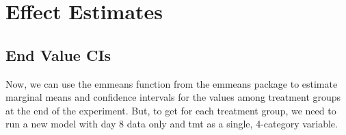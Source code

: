 \documentclass[
]{article}
\begin{document}
\hypertarget{effect-estimates}{%
\section{Effect Estimates}\label{effect-estimates}}

\hypertarget{end-value-cis}{%
\subsection{End Value CIs}\label{end-value-cis}}

Now, we can use the emmeans function from the emmeans package to
estimate marginal means and confidence intervals for the values among
treatment groups at the end of the experiment. But, to get for each
treatment group, we need to run a new model with day 8 data only and tmt
as a single, 4-category variable.
\end{document}
